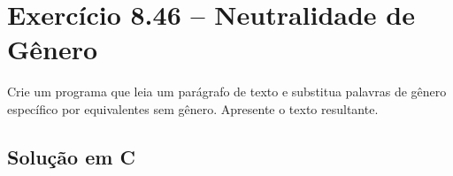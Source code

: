 \documentclass[12pt,a4paper]{article}
\begin{document}
\newpage

\section{Exercício 8.46 -- Neutralidade de Gênero}

\begin{enunciadoBox}[Enunciado 8.46]
Crie um programa que leia um parágrafo de texto e substitua palavras de gênero
específico por equivalentes sem gênero. Apresente o texto resultante.
\end{enunciadoBox}

\subsection*{Solução em C}
\end{document}
